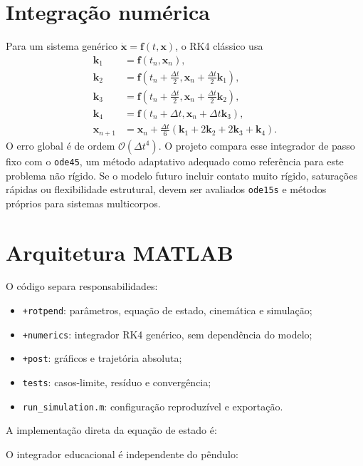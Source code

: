 \documentclass[11pt,a4paper]{article}
\newcommand{\bvec}[1]{\bm{#1}}
\begin{document}
\section{Integração numérica}

Para um sistema genérico $\dot{\bvec x}=\bvec f(t,\bvec x)$, o RK4 clássico usa
\begin{align}
\bvec k_1&=\bvec f(t_n,\bvec x_n),\\
\bvec k_2&=\bvec f(t_n+\tfrac{\Delta t}{2},
\bvec x_n+\tfrac{\Delta t}{2}\bvec k_1),\\
\bvec k_3&=\bvec f(t_n+\tfrac{\Delta t}{2},
\bvec x_n+\tfrac{\Delta t}{2}\bvec k_2),\\
\bvec k_4&=\bvec f(t_n+\Delta t,\bvec x_n+\Delta t\bvec k_3),\\
\bvec x_{n+1}&=\bvec x_n+\frac{\Delta t}{6}
(\bvec k_1+2\bvec k_2+2\bvec k_3+\bvec k_4).
\end{align}
O erro global é de ordem $\mathcal O(\Delta t^4)$. O projeto compara esse
integrador de passo fixo com o \texttt{ode45}, um método adaptativo adequado
como referência para este problema não rígido. Se o modelo futuro incluir
contato muito rígido, saturações rápidas ou flexibilidade estrutural, devem ser
avaliados \texttt{ode15s} e métodos próprios para sistemas multicorpos.

\section{Arquitetura MATLAB}

O código separa responsabilidades:
\begin{itemize}
  \item \texttt{+rotpend}: parâmetros, equação de estado, cinemática e simulação;
  \item \texttt{+numerics}: integrador RK4 genérico, sem dependência do modelo;
  \item \texttt{+post}: gráficos e trajetória absoluta;
  \item \texttt{tests}: casos-limite, resíduo e convergência;
  \item \texttt{run\_simulation.m}: configuração reproduzível e exportação.
\end{itemize}

A implementação direta da equação de estado é:


O integrador educacional é independente do pêndulo:

\end{document}

